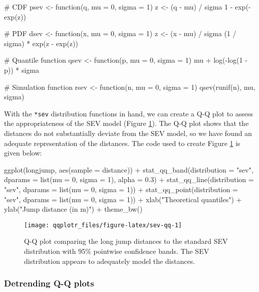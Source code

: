 \begin{Schunk}
\begin{Sinput}
# CDF
psev <- function(q, mu = 0, sigma = 1) {
    z <- (q - mu) / sigma
    1 - exp(-exp(z))
}

# PDF
dsev <- function(x, mu = 0, sigma = 1) {
  z <- (x - mu) / sigma
  (1 / sigma) * exp(z - exp(z))
}

# Quantile function
qsev <- function(p, mu = 0, sigma = 1) {
  mu + log(-log(1 - p)) * sigma
}

# Simulation function
rsev <- function(n, mu = 0, sigma = 1) {
  qsev(runif(n), mu, sigma)
}
\end{Sinput}
\end{Schunk}

With the \texttt{*sev} distribution functions in hand, we can create a
Q-Q plot to assess the appropriateness of the SEV model (Figure
\ref{fig:sev-qq}). The Q-Q plot shows that the distances do not
substantially deviate from the SEV model, so we have found an adequate
representation of the distances. The code used to create Figure
\ref{fig:sev-qq} is given below:

\begin{Schunk}
\begin{Sinput}
ggplot(longjump, aes(sample = distance)) +
  stat_qq_band(distribution = "sev", dparams = list(mu = 0, sigma = 1), 
               alpha = 0.3) +
  stat_qq_line(distribution = "sev", dparams = list(mu = 0, sigma = 1)) +
  stat_qq_point(distribution = "sev", dparams = list(mu = 0, sigma = 1)) +
  xlab("Theoretical quantiles") +
  ylab("Jump distance (in m)") +
  theme_bw()
\end{Sinput}
\begin{figure}

{\centering \texttt{[image: qqplotr\_files/figure-latex/sev-qq-1]} 

}

\caption[Q-Q plot comparing the long jump distances to the standard SEV distribution with 95\% pointwise confidence bands]{Q-Q plot comparing the long jump distances to the standard SEV distribution with 95\% pointwise confidence bands. The SEV distribution appears to adequately model the distances.}\label{fig:sev-qq}
\end{figure}
\end{Schunk}

\subsubsection{Detrending Q-Q plots}\label{detrending-q-q-plots}

